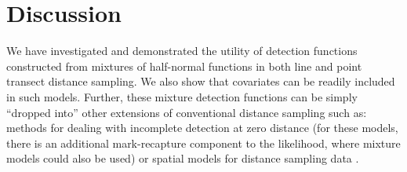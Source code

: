\documentclass[authoryear,preprint,review,12pt]{elsarticle}
\begin{document}

\section{Discussion}
\label{s:discuss}

We have investigated and demonstrated the utility of detection functions constructed from mixtures of half-normal functions in both line and point transect distance sampling. We also show that covariates can be readily included in such models. Further, these mixture detection functions can be simply ``dropped into'' other extensions of conventional distance sampling such as: methods for dealing with incomplete detection at zero distance \citep{Laake:2004tz, Laake:2011vm} (for these models, there is an additional mark-recapture component to the likelihood, where mixture models could also be used) or spatial models for distance sampling data \citep{Hedley:2004et, Miller:2013us}.
\end{document}
